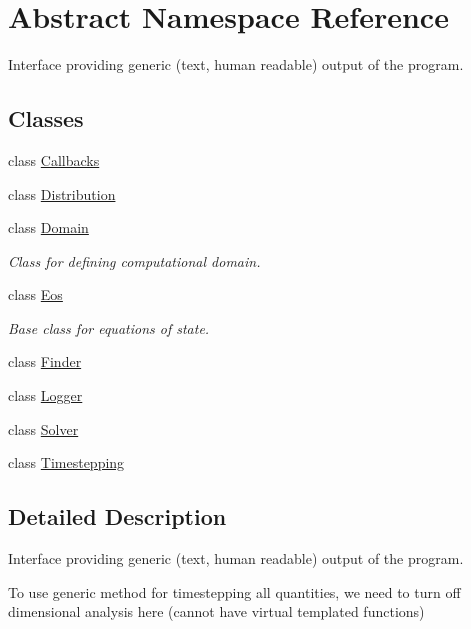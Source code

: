 \hypertarget{namespaceAbstract}{}\section{Abstract Namespace Reference}
\label{namespaceAbstract}


Interface providing generic (text, human readable) output of the program.  


\subsection*{Classes}
\begin{DoxyCompactItemize}
\item 
class \hyperlink{classAbstract_1_1Callbacks}{Callbacks}
\item 
class \hyperlink{classAbstract_1_1Distribution}{Distribution}
\item 
class \hyperlink{classAbstract_1_1Domain}{Domain}
\begin{DoxyCompactList}\small\item\em Class for defining computational domain. \end{DoxyCompactList}\item 
class \hyperlink{classAbstract_1_1Eos}{Eos}
\begin{DoxyCompactList}\small\item\em Base class for equations of state. \end{DoxyCompactList}\item 
class \hyperlink{classAbstract_1_1Finder}{Finder}
\item 
class \hyperlink{classAbstract_1_1Logger}{Logger}
\item 
class \hyperlink{classAbstract_1_1Solver}{Solver}
\item 
class \hyperlink{classAbstract_1_1Timestepping}{Timestepping}
\end{DoxyCompactItemize}


\subsection{Detailed Description}
Interface providing generic (text, human readable) output of the program. 

To use generic method for timestepping all quantities, we need to turn off dimensional analysis here (cannot have virtual templated functions) 